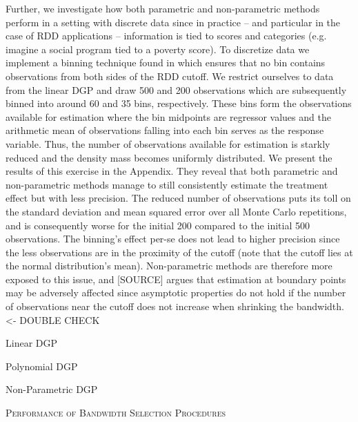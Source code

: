 Further, we investigate how both parametric and non-parametric methods perform in a setting with discrete data since in practice -- and particular in the case of RDD applications -- information is tied to scores and categories (e.g. imagine a social program tied to a poverty score). To discretize data we implement a binning technique found in \cite{mccrary_2008} which ensures that no bin contains observations from both sides of the RDD cutoff. We restrict ourselves to data from the linear DGP and draw 500 and 200 observations which are subsequently binned into around 60 and 35 bins, respectively. These bins form the observations available for estimation where the bin midpoints are regressor values and the arithmetic mean of observations falling into each bin serves as the response variable. Thus, the number of observations available for estimation is starkly reduced and the density mass becomes uniformly distributed. We present the results of this exercise in the Appendix. They reveal that both parametric and non-parametric methods manage to still consistently estimate the treatment effect but with less precision. The reduced number of observations puts its toll on the standard deviation and mean squared error over all Monte Carlo repetitions, and is consequently worse for the initial 200 compared to the initial 500 observations. The binning's effect per-se does not lead to higher precision since the less observations are in the proximity of the cutoff (note that the cutoff lies at the normal distribution's mean). Non-parametric methods are therefore more exposed to this issue, and [SOURCE] argues that estimation at boundary points may be adversely affected since asymptotic properties do not hold if the number of observations near the cutoff does not increase when shrinking the bandwidth. <- DOUBLE CHECK

\begin{table}[H]
	\begin{subtable}{\textwidth}
		\centering
		
		\caption{Linear DGP}
		\label{tab: bw_perf_linear}
		\hspace{\fill}
	\end{subtable}
	\begin{subtable}{\textwidth}
		\centering
		
		\caption{Polynomial DGP}
		\label{tab: bw_perf_poly}
		\hspace{\fill}
	\end{subtable}
	\begin{subtable}{\textwidth}
		\centering
		
		\caption{Non-Parametric DGP}
		\label{tab: bw_perf_nonparam}
	\end{subtable}
	\caption{\textsc{Performance of Bandwidth Selection Procedures}}
\end{table}


